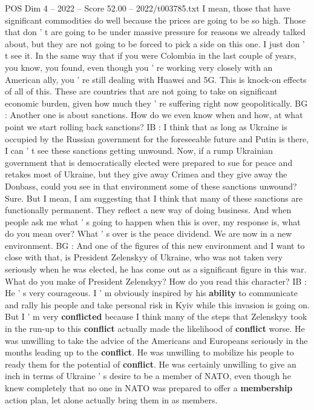 \begin{textsample}{POS Dim 4 – 2022 – Score 52.00 – 2022/t003785.txt}
I mean, those that have significant commodities do well because the prices are going to be so high.
Those that don ' t are going to be under massive pressure for reasons we already talked about, but they are not going to be forced to pick a side on this one.
I just don ' t see it.
In the same way that if you were Colombia in the last couple of years, you know, you found, even though you ' re working very closely with an American ally, you ' re still dealing with Huawei and 5G.
This is knock-on effects of all of this.
These are countries that are not going to take on significant economic burden, given how much they ' re suffering right now geopolitically.
BG : Another one is about sanctions.
How do we even know when and how, at what point we start rolling back sanctions?
IB : I think that as long as Ukraine is occupied by the Russian government for the foreseeable future and Putin is there, I can ' t see these sanctions getting unwound.
Now, if a rump Ukrainian government that is democratically elected were prepared to sue for peace and retakes most of Ukraine, but they give away Crimea and they give away the Donbass, could you see in that environment some of these sanctions unwound?
Sure.
But I mean, I am suggesting that I think that many of these sanctions are functionally permanent.
They reflect a new way of doing business.
And when people ask me what ' s going to happen when this is over, my response is, what do you mean over?
What ' s over is the peace dividend.
We are now in a new environment.
BG : And one of the figures of this new environment and I want to close with that, is President Zelenskyy of Ukraine, who was not taken very seriously when he was elected, he has come out as a significant figure in this war.
What do you make of President Zelenskyy?
How do you read this character?
IB : He ' s very courageous.
I ' m obviously inspired by his \textbf{ability} to communicate and rally his people and take personal risk in Kyiv while this invasion is going on.
But I ' m very \textbf{conflicted} because I think many of the steps that Zelenskyy took in the run-up to this \textbf{conflict} actually made the likelihood of \textbf{conflict} worse.
He was unwilling to take the advice of the Americans and Europeans seriously in the months leading up to the \textbf{conflict}.
He was unwilling to mobilize his people to ready them for the potential of \textbf{conflict}.
He was certainly unwilling to give an inch in terms of Ukraine ' s desire to be a member of NATO, even though he knew completely that no one in NATO was prepared to offer a \textbf{membership} action plan, let alone actually bring them in as members.

\end{textsample}
